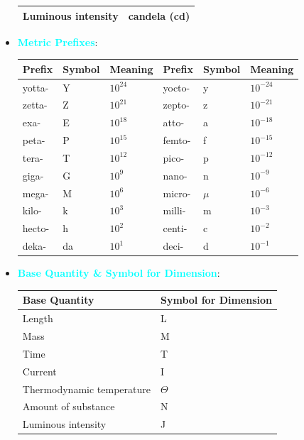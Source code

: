 \documentclass{report}
\begin{document}
\begin{itemize}
\begin{tabularx}{\textwidth}{|X|X|}
                Luminous intensity & candela (cd) \\
                \hline
            \end{tabularx}
            \pagebreak 
        \item \textbf{\textcolor{cyan}{Metric Prefixes}}:
            \begin{center}
                \begin{tabularx}{\textwidth}{|X|X|X|X|X|X|}
                    \hline
                    Prefix & Symbol & Meaning & Prefix & Symbol & Meaning \\ 
                    \hline
                    yotta- & Y & $10^{24}$ & yocto- & y & $10^{-24}$ \\
                    zetta- & Z & $10^{21}$ & zepto- & z & $10^{-21}$ \\
                    exa-   & E & $10^{18}$ & atto-  & a & $10^{-18}$ \\
                    peta-  & P & $10^{15}$ & femto- & f & $10^{-15}$ \\
                    tera-  & T & $10^{12}$ & pico-  & p & $10^{-12}$ \\
                    giga-  & G & $10^9$   & nano-  & n & $10^{-9}$  \\
                    mega-  & M & $10^6$   & micro- & $\mu$ & $10^{-6}$ \\
                    kilo-  & k & $10^3$   & milli- & m & $10^{-3}$ \\
                    hecto- & h & $10^2$   & centi- & c & $10^{-2}$ \\
                    deka-  & da & $10^1$  & deci-  & d & $10^{-1}$ \\
                    \hline
                \end{tabularx}
            \end{center}
            \bigbreak \noindent 
        \item \textbf{\textcolor{cyan}{Base Quantity \& Symbol for Dimension}}:
            \begin{center}
                \begin{tabularx}{\textwidth}{|X|X|}
                    \hline
                    Base Quantity & Symbol for Dimension \\
                    \hline
                    Length & L \\
                    Mass & M \\
                    Time & T \\
                    Current & I \\
                    Thermodynamic temperature & $\Theta$ \\
                    Amount of substance & N \\
                    Luminous intensity & J \\
                    \hline
                \end{tabularx}
            \end{center}
    \end{itemize}
\end{document}
